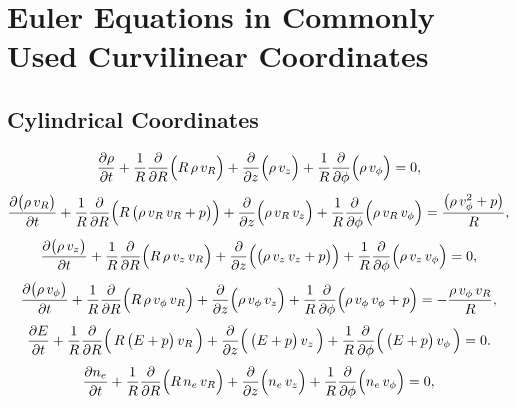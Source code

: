 \documentclass[10pt,preprint]{aastex}
\begin{document}



\appendix

\section{Euler Equations in Commonly Used Curvilinear Coordinates}
\label{app:CurvilinearEuler}

\subsection{Cylindrical Coordinates}

\begin{equation}
  \frac{\partial \rho}{\partial t}
  +\frac{1}{R}\frac{\partial }{\partial R}\Big(R\,\rho\,v_{R}\Big)
  +\frac{\partial }{\partial z}\Big(\rho\,v_{z}\Big)
  +\frac{1}{R}\frac{\partial }{\partial \phi}\Big(\rho\,v_{\phi}\Big)=0,
\end{equation}
\begin{equation}
  \frac{\partial \big(\rho\,v_{R}\big)}{\partial t}
  +\frac{1}{R}\frac{\partial }{\partial R}\Big(R\,\big(\rho\,v_{R}\,v_{R}+p\big)\Big)
  +\frac{\partial }{\partial z}\Big(\rho\,v_{R}\,v_{z}\Big)
  +\frac{1}{R}\frac{\partial }{\partial \phi}\Big(\rho\,v_{R}\,v_{\phi}\Big)
  =\frac{\big(\rho\,v_{\phi}^{2}+p\big)}{R},
\end{equation}
\begin{equation}
  \frac{\partial \big(\rho\,v_{z}\big)}{\partial t}
  +\frac{1}{R}\frac{\partial }{\partial R}\Big(R\,\rho\,v_{z}\,v_{R}\Big)
  +\frac{\partial }{\partial z}\Big(\big(\rho\,v_{z}\,v_{z}+p\big)\Big)
  +\frac{1}{R}\frac{\partial }{\partial \phi}\Big(\rho\,v_{z}\,v_{\phi}\Big)=0,
\end{equation}
\begin{equation}
  \frac{\partial \big(\rho\,v_{\phi}\big)}{\partial t}
  +\frac{1}{R}\frac{\partial }{\partial R}\Big(R\,\rho\,v_{\phi}\,v_{R}\Big)
  +\frac{\partial }{\partial z}\Big(\rho\,v_{\phi}\,v_{z}\Big)
  +\frac{1}{R}\frac{\partial }{\partial \phi}\Big(\rho\,v_{\phi}\,v_{\phi}+p\Big)
  =-\frac{\rho\,v_{\phi}\,v_{R}}{R},
\end{equation}
\begin{equation}
  \frac{\partial E}{\partial t}+\frac{1}{R}\frac{\partial }{\partial R}\Big(\,R\,\big(E+p\big)\,v_{R}\,\Big)+\frac{\partial }{\partial z}\Big(\,\big(E+p\big)\,v_{z}\,\Big)+\frac{1}{R}\frac{\partial }{\partial \phi}\Big(\,\big(E+p\big)\,v_{\phi}\,\Big)=0.
\end{equation}
\begin{equation}
  \frac{\partial n_{e}}{\partial t}
  +\frac{1}{R}\frac{\partial }{\partial R}\Big(R\,n_{e}\,v_{R}\Big)
  +\frac{\partial }{\partial z}\Big(n_{e}\,v_{z}\Big)
  +\frac{1}{R}\frac{\partial }{\partial \phi}\Big(n_{e}\,v_{\phi}\Big)=0,
\end{equation}
\end{document}
